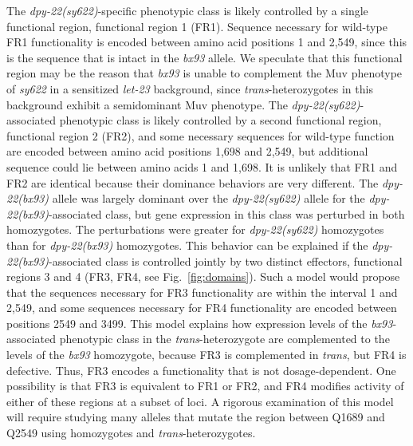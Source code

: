\documentclass[9pt,twocolumn,twoside]{gsajnl}
\newcommand{\gene}[1]{\mbox{\emph{#1}}}
\newcommand{\dpy}[1]{\gene{dpy-22#1}}
\newcommand{\bx}{\dpy{(bx93)}}
\newcommand{\sy}{\dpy{(sy622)}}
\begin{document}
The \sy{}-specific phenotypic class is likely controlled by a single functional
region, functional region 1 (FR1). Sequence necessary for wild-type FR1
functionality is encoded between amino acid positions 1 and 2,549, since this is
the sequence that is intact in the \emph{bx93} allele. We speculate that this
functional region may be the reason that \emph{bx93} is unable to complement the
Muv phenotype of \emph{sy622} in a sensitized \emph{let-23} background, since
\emph{trans}-heterozygotes in this background exhibit a semidominant Muv
phenotype.  The \sy{}-associated phenotypic class is likely controlled by a
second functional region, functional region 2 (FR2), and some necessary
sequences for wild-type function are encoded between amino acid positions 1,698
and 2,549, but additional sequence could lie between amino acids 1 and 1,698. It
is unlikely that FR1 and FR2 are identical because their dominance behaviors are
very different. The \bx{} allele was largely dominant over the \sy{} allele for
the \bx{}-associated class, but gene expression in this class was perturbed in
both homozygotes. The perturbations were greater for \sy{} homozygotes than for
\bx{} homozygotes. This behavior can be explained if the \bx{}-associated class
is controlled jointly by two distinct effectors, functional regions 3 and 4
(FR3, FR4, see Fig.~\ref{fig:domains}). Such a model would propose that the
sequences necessary for FR3 functionality are within the interval 1 and 2,549,
and some sequences necessary for FR4 functionality are encoded between positions
2549 and 3499. This model explains how expression levels of the
\emph{bx93}-associated phenotypic class in the \emph{trans}-heterozygote are
complemented to the levels of the \emph{bx93} homozygote, because FR3 is
complemented in \emph{trans}, but FR4 is defective. Thus, FR3 encodes a
functionality that is not dosage-dependent. One possibility is that FR3 is
equivalent to FR1 or FR2, and FR4 modifies activity of either of these regions
at a subset of loci. A rigorous examination of this model will require studying
many alleles that mutate the region between Q1689 and Q2549 using homozygotes
and \emph{trans}-heterozygotes.
\end{document}
